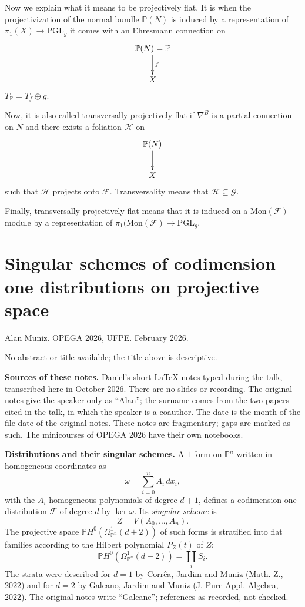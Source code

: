 \medskip\noindent
Now we explain what it means to be
projectively flat.
It is when the projectivization of the normal
bundle $\mathbb{P}(N)$
is induced by a representation of $\pi_1(X)
\to \text{PGL}_g$
it comes with an Ehresmann connection on
$$
\xymatrix{
\mathbb{P}(N)=\mathbb{P}\ar[d]^{f}\\
X
}
$$
$T_{\mathbb{P}}=T_f \oplus g$.

Now, it is also called transversally
projectively flat
if $\nabla^B$ is a partial connection on $N$
and there exists a foliation $\mathcal{H}$ on
$$
\xymatrix{
\mathbb{P}(N)\ar[d]\\ X
}
$$
such that $\mathcal{H}$ projects onto
$\mathcal{F}$.
Transversality means that $\mathcal{H}
\subseteq \mathcal{G}$.

Finally, transversally projectively flat
means that
it is induced on a
$\text{Mon}(\mathcal{F})$-module
by a representation of
$\pi_1(\text{Mon}(\mathcal{F}) \to
\text{PGL}_g$.

\section{Singular schemes of codimension one
distributions on projective space}
\label{section-muniz-distributions}

\noindent
Alan Muniz.
OPEGA 2026, UFPE.
February 2026.

\medskip\noindent
No abstract or title available; the title
above is descriptive.

\medskip\noindent
{\bf Sources of these notes.} Daniel's short
LaTeX notes typed during the talk,
transcribed here in October 2026. There are
no slides or recording. The original notes
give the speaker only as ``Alan''; the
surname comes from the two papers cited in
the talk, in which the speaker is a coauthor.
The date is the month of the file date of
the original notes. These notes are
fragmentary; gaps are marked as such. The
minicourses of OPEGA 2026 have their own
notebooks.

\medskip\noindent
{\bf Distributions and their singular
schemes.} A $1$-form on $\mathbb{P}^n$
written in homogeneous coordinates as
$$
\omega=\sum_{i=0}^n A_i\,dx_i,
$$
with the $A_i$ homogeneous polynomials of
degree $d+1$, defines a codimension one
distribution $\mathcal{F}$ of degree $d$ by
$\ker\omega$. Its \emph{singular scheme} is
$$
Z=V(A_0,\ldots,A_n).
$$
The projective space
$\mathbb{P}H^0(\Omega^1_{\mathbb{P}^n}(d+2))$
of such forms is stratified into flat
families according to the Hilbert polynomial
$P_Z(t)$ of $Z$:
$$
\mathbb{P}H^0(\Omega^1_{\mathbb{P}^n}(d+2))
=\coprod_i S_i.
$$
The strata were described for $d=1$ by
Corrêa, Jardim and Muniz (Math. Z., 2022)
and for $d=2$ by Galeano, Jardim and Muniz
(J. Pure Appl. Algebra, 2022). The original
notes write ``Galeane''; references as
recorded, not checked.

